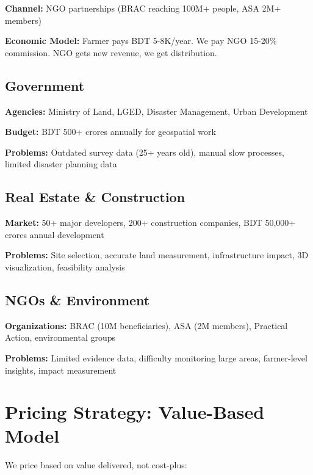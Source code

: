 \textbf{Channel:} NGO partnerships (BRAC reaching 100M+ people, ASA 2M+ members)

\textbf{Economic Model:} Farmer pays BDT 5-8K/year. We pay NGO 15-20\% commission. NGO gets new revenue, we get distribution.

\subsection{Government}

\textbf{Agencies:} Ministry of Land, LGED, Disaster Management, Urban Development

\textbf{Budget:} BDT 500+ crores annually for geospatial work

\textbf{Problems:} Outdated survey data (25+ years old), manual slow processes, limited disaster planning data

\subsection{Real Estate \& Construction}

\textbf{Market:} 50+ major developers, 200+ construction companies, BDT 50,000+ crores annual development

\textbf{Problems:} Site selection, accurate land measurement, infrastructure impact, 3D visualization, feasibility analysis

\subsection{NGOs \& Environment}

\textbf{Organizations:} BRAC (10M beneficiaries), ASA (2M members), Practical Action, environmental groups

\textbf{Problems:} Limited evidence data, difficulty monitoring large areas, farmer-level insights, impact measurement

\section{Pricing Strategy: Value-Based Model}

We price based on value delivered, not cost-plus:

